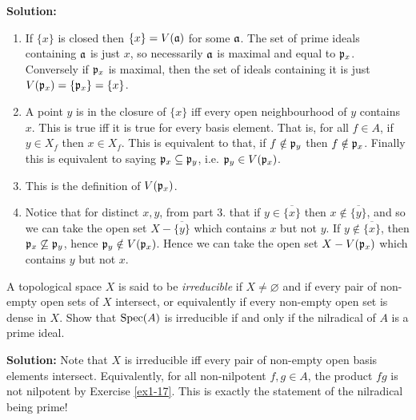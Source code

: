 \documentclass{article}
\begin{document}
\noindent\textbf{Solution:}
\begin{enumerate}
    \item
        If \(\{x\}\) is closed then \(\{x\} = V(\mathfrak{a})\) for some \(\mathfrak{a}\).
        The set of prime ideals containing \(\mathfrak{a}\) is just \(x\), so necessarily \(\mathfrak{a}\) is maximal and equal to \(\mathfrak{p}_x\).
        Conversely if \(\mathfrak{p}_x\) is maximal, then the set of ideals containing it is just \(V(\mathfrak{p}_x) = \{\mathfrak{p}_x\} = \{x\}\).
    \item
        A point \(y\) is in the closure of \(\{x\}\) iff every open neighbourhood of \(y\) contains \(x\).
        This is true iff it is true for every basis element.
        That is, for all \(f \in A\), if \(y \in X_f\) then \(x \in X_f\).
        This is equivalent to that, if \(f \notin \mathfrak{p}_y\) then \(f \notin \mathfrak{p}_x\).
        Finally this is equivalent to saying \(\mathfrak{p}_x \subseteq \mathfrak{p}_y\), i.e. \(\mathfrak{p}_y \in V(\mathfrak{p}_x)\).
    \item
        This is the definition of \(V(\mathfrak{p}_x)\).
    \item
        Notice that for distinct \(x, y\), from part 3. that if \(y \in \overline{\{x\}}\) then \(x \notin \overline{\{y\}}\), and so we can take the open set \(X - \overline{\{y\}}\) which contains \(x\) but not \(y\).
        If \(y \notin \overline{\{x\}}\), then \(\mathfrak{p}_x \not\subseteq \mathfrak{p}_y\), hence \(\mathfrak{p}_y \notin V(\mathfrak{p}_x)\).
        Hence we can take the open set \(X - V(\mathfrak{p}_x)\) which contains \(y\) but not \(x\).
\end{enumerate}

\begin{exercise} \label{ex1-19}
    A topological space \(X\) is said to be \textit{irreducible} if \(X \neq \varnothing\) and if every pair of non-empty open sets of \(X\) intersect, or equivalently if every non-empty open set is dense in \(X\).
    Show that \(\operatorname{Spec}(A)\) is irreducible if and only if the nilradical of \(A\) is a prime ideal.
\end{exercise}

\noindent\textbf{Solution:}
Note that \(X\) is irreducible iff every pair of non-empty open basis elements intersect.
Equivalently, for all non-nilpotent \(f, g \in A\), the product \(fg\) is not nilpotent by Exercise \ref{ex1-17}.
This is exactly the statement of the nilradical being prime!
\end{document}
